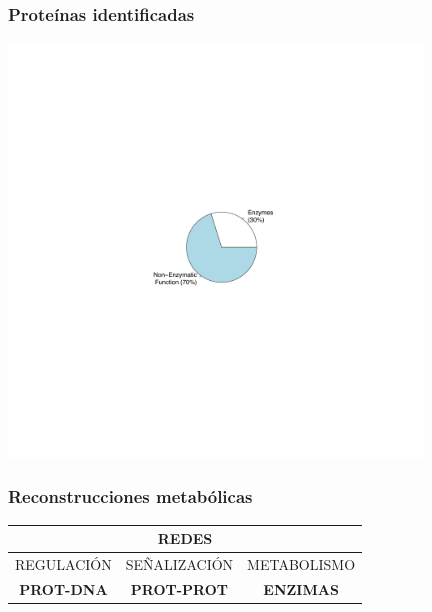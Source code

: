 \documentclass[10pt]{beamer}
\begin{document}
\begin{frame}
\frametitle{Proteínas identificadas}
\begin{center}
\includegraphics[width=11cm]{imagenes/ECProt}
\end{center}
\end{frame}
\begin{frame}
\frametitle{Reconstrucciones metabólicas}
\begin{center}
\begin{tabular}{|c|c|c|}
\hline
\multicolumn{3}{|c|}{\textbf{REDES}}\\
\hline
\hline
REGULACIÓN&SEÑALIZACIÓN&METABOLISMO\\
\hline
\textbf{PROT-DNA}&\textbf{PROT-PROT}& \textbf{ENZIMAS} \\
\hline
\end{tabular}
\end{center}\end{frame}
\end{document}
